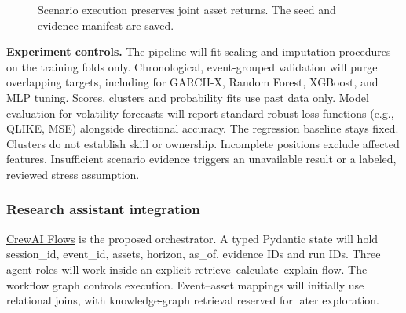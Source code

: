 \begin{figure}[H]
\centering
{}
\caption{Scenario execution preserves joint asset returns. The seed and evidence manifest are saved.}
\end{figure}
\textbf{Experiment controls.} The pipeline will fit scaling and imputation procedures on the training folds only. Chronological, event-grouped validation will purge overlapping targets, including for GARCH-X, Random Forest, XGBoost, and MLP tuning. Scores, clusters and probability fits use past data only. Model evaluation for volatility forecasts will report standard robust loss functions (e.g., QLIKE, MSE) alongside directional accuracy. The regression baseline stays fixed. Clusters do not establish skill or ownership. Incomplete positions exclude affected features. Insufficient scenario evidence triggers an unavailable result or a labeled, reviewed stress assumption.

\clearpage
\subsubsection{Research assistant integration}
\href{https://docs.crewai.com/en/concepts/flows}{CrewAI Flows} is the proposed orchestrator. A typed Pydantic state will hold session\_id, event\_id, assets, horizon, as\_of, evidence IDs and run IDs. Three agent roles will work inside an explicit retrieve--calculate--explain flow. The workflow graph controls execution. Event--asset mappings will initially use relational joins, with knowledge-graph retrieval reserved for later exploration.

